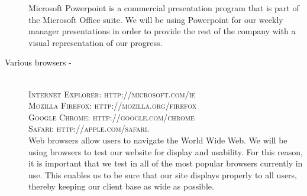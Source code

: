 \begin{description}
			Microsoft Powerpoint is a commercial presentation program that is part of the Microsoft Office suite. We will be using Powerpoint for our weekly manager presentations in order to provide the rest of the company with a visual representation of our progress.
		\item[Various browsers -] \hfill \\
		\textsc{Internet Explorer: http://microsoft.com/ie} \\ \textsc{Mozilla Firefox: http://mozilla.org/firefox} \\ \textsc{Google Chrome: http://google.com/chrome} \\ \textsc{Safari: http://apple.com/safari.}\\
			Web browsers allow users to navigate the World Wide Web. We will be using browsers to test our website for display and usability. For this reason, it is important that we test in all of the most popular browsers currently in use. This enables us to be sure that our site displays properly to all users, thereby keeping our client base as wide as possible.
			
	\end{description}

